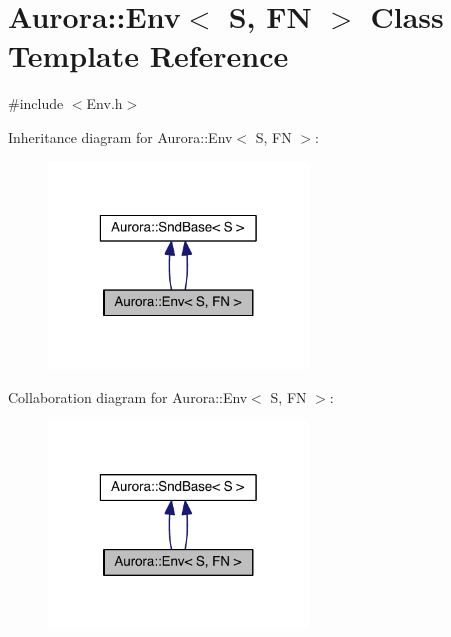 \hypertarget{class_aurora_1_1_env}{}\section{Aurora\+:\+:Env$<$ S, FN $>$ Class Template Reference}
\label{class_aurora_1_1_env}


{\ttfamily \#include $<$Env.\+h$>$}



Inheritance diagram for Aurora\+:\+:Env$<$ S, FN $>$\+:
\nopagebreak
\begin{figure}[H]
\begin{center}
\leavevmode
\includegraphics[width=196pt]{class_aurora_1_1_env__inherit__graph}
\end{center}
\end{figure}


Collaboration diagram for Aurora\+:\+:Env$<$ S, FN $>$\+:
\nopagebreak
\begin{figure}[H]
\begin{center}
\leavevmode
\includegraphics[width=196pt]{class_aurora_1_1_env__coll__graph}
\end{center}
\end{figure}
